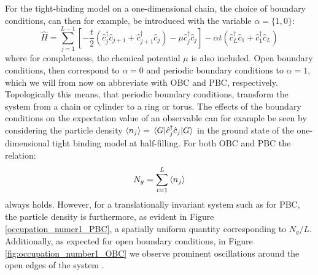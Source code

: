 \documentclass[11pt, a4paper, oneside]{book}
\theoremstyle{definition} %
\begin{document}
  For the tight-binding model on a one-dimensional chain, the choice of boundary conditions, can then for example, be introduced with the variable $\alpha = \{1,0\}$:
\begin{equation}
	\hat{H} =  \sum_{j=1}^{L-1} \left[- \frac{t}{2} (\hat{c}_j^\dagger \hat{c}_{j+1} + \hat{c}_{j + 1}^\dagger \hat{c}_j)  - \mu\hat{c}_j^\dagger \hat{c}_j \right] - \alpha t( \hat{c}_{L}^\dagger \hat{c}_1 + \hat{c}_1^\dagger \hat{c}_L)
\end{equation}
where for completeness, the chemical potential $\mu$ is also included. Open boundary conditions, then correspond to $\alpha = 0$ and periodic boundary conditions to $\alpha = 1$, which we will from now on abbreviate with OBC and PBC, respectively. Topologically this means, that periodic boundary conditions, transform the system from a chain or cylinder to a ring or torus. The effects of the boundary conditions on the expectation value of an observable can for example be seen by considering the particle density $\expval{n_j} = \mel{G}{\hat{c}_j^\dagger \hat{c}_j}{G}$ in the ground state of the one-dimensional tight binding model at half-filling. For both OBC and PBC the relation:
\begin{equation}
	N_g = \sum_{i=1}^L \expval{n_j}
\end{equation}
always holds. However, for a translationally invariant system such as for PBC, the particle density is furthermore, as evident in Figure \ref{occupation_numer1_PBC}, a spatially uniform quantity corresponding to $N_g/L$. Additionally, as expected for open boundary conditions, in Figure \ref{fig:occupation_number1_OBC} we observe prominent oscillations around the open edges of the system \cite{Hotta}. \\
\end{document}
